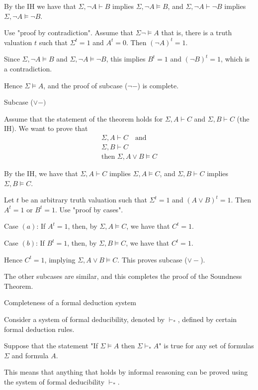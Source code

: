 \documentclass{article}
\begin{document}
By the IH we have that $\Sigma, \neg A \vdash B$ implies $\Sigma, \neg A \vDash B$, and $\Sigma, \neg A \vdash \neg B$ implies $\Sigma, \neg A \vDash \neg B$. 

Use "proof by contradiction". Assume that $\Sigma \neg\vDash A$ that is, there is a truth valuation $t$ such that $\Sigma^t = 1$ and $A^t = 0$. Then $(\neg A)^t = 1$. 

Since $\Sigma, \neg A \vDash B$ and $\Sigma, \neg A \vDash \neg B$, this implies $B^t = 1$ and $(\neg B)^t = 1$, which is a contradiction. 

Hence $\Sigma \vDash A$, and the proof of subcase ($\neg -$) is complete. 

Subcase ($\vee -)$

Assume that the statement of the theorem holds for $\Sigma, A \vdash C$ and $\Sigma, B \vdash C$ (the IH). We want to prove that
\begin{align*}
\Sigma, A \vdash C \quad \text{and} \\
\Sigma, B \vdash C \\
\text{then } \Sigma, A \vee B \vDash C
\end{align*}

By the IH, we have that $\Sigma, A \vdash C$ implies $\Sigma, A \vDash C$, and $\Sigma, B \vdash C$ implies $\Sigma, B \vDash C$. 

Let $t$ be an arbitrary truth valuation such that $\Sigma^t = 1$ and $(A \vee B)^t = 1$. Then $A^t = 1$ or $B^t = 1$. Use "proof by cases". 

Case $(a)$: If $A^t = 1$, then, by $\Sigma, A \vDash C$, we have that $C^t = 1$. 

Case $(b)$: If $B^t = 1$, then, by $\Sigma, B \vDash C$, we have that $C^t = 1$. 

Hence $C^t = 1$, implying $\Sigma, A \vee B \vDash C$. This proves subcase ($\vee -$). 

The other subcases are similar, and this completes the proof of the Soundness Theorem.

Completeness of a formal deduction system

Consider a system of formal deducibility, denoted by $\vdash_*$, defined by certain formal deduction rules.

Suppose that the statement "If $\Sigma \vDash A$ then $\Sigma \vdash_* A$" is true for any set of formulas $\Sigma$ and formula $A$. 

This means that anything that holds by informal reasoning can be proved using the system of formal deducibility $\vdash_*$. 
\end{document}
